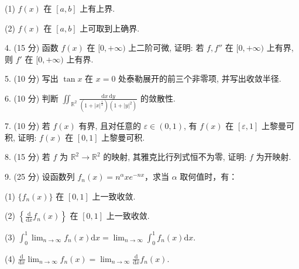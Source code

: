 \documentclass{examcollection}
\begin{document}
{\begin{minipage}{\textwidth}
(1) $f(x)$ 在 $[a, b]$ 上有上界.\par
(2) $f(x)$ 在 $[a, b]$ 上可取到上确界.\par
4. (15 分) 函数 $f(x)$ 在 $[0, +\infty)$ 上二阶可微, 证明: 若 $f, f''$ 在 $[0, +\infty)$ 上有界, 则 $f'$ 在 $[0, +\infty)$ 上有界.\par
5. (10 分) 写出 $\tan x$ 在 $x = 0$ 处泰勒展开的前三个非零项, 并写出收敛半径.\par
6. (10 分) 判断 $\iint_{\mathbb{R}^2} \frac{\mathrm{d}x \mathrm{~d}y}{(1 + |x|^{\frac{1}{2}})(1 + |y|^2)}$ 的敛散性.\par
7. (10 分) 若 $f(x)$ 有界, 且对任意的 $\varepsilon \in (0,1)$, 有 $f(x)$ 在 $[\varepsilon,1]$ 上黎曼可积, 证明: $f(x)$ 在 $[0,1]$ 上黎曼可积.\par
8. (15 分) 若 $f$ 为 $\mathbb{R}^2 \to \mathbb{R}^2$ 的映射, 其雅克比行列式恒不为零, 证明: $f$ 为开映射.\par
9. (25 分) 设函数列 $f_{n}(x) = n^{\alpha}xe^{-nx}$，求当 $\alpha$ 取何值时，有：\par
(1) $\{f_n(x)\}$ 在 $[0,1]$ 上一致收敛.\par
(2) $\left\{\frac{\mathrm{d}}{\mathrm{d}x} f_n(x)\right\}$ 在 $[0,1]$ 上一致收敛.\par
(3) $\int_0^1\lim_{n\to \infty}f_n(x)\mathrm{d}x = \lim_{n\to \infty}\int_0^1 f_n(x)\mathrm{d}x.$\par
(4) $\frac{\mathrm{d}}{\mathrm{d}x}\lim_{n\to \infty}f_n(x) = \lim_{n\to \infty}\frac{\mathrm{d}}{\mathrm{d}x} f_n(x).$\par
\end{minipage}}
\ifdim\dimexpr\ht\proofbox+\dp\proofbox\relax>\textheight
\noindent\resizebox{!}{\textheight}{\usebox{\proofbox}}\else\noindent\usebox{\proofbox}\fi\clearpage
\end{document}
